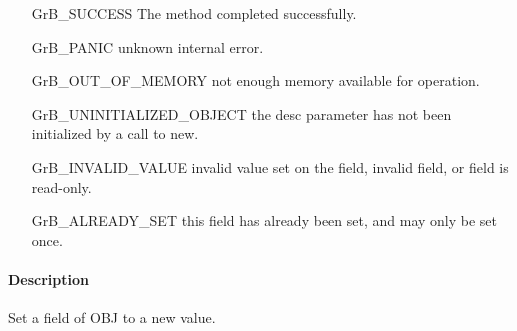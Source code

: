 \begin{itemize}[leftmargin=2.1in]
    \item[{\sf GrB\_SUCCESS}]  The method completed successfully.
    \item[{\sf GrB\_PANIC}]             unknown internal error.
    \item[{\sf GrB\_OUT\_OF\_MEMORY}]          not enough memory available for operation.
    \item[{\sf GrB\_UNINITIALIZED\_OBJECT}]          the {\sf desc} parameter has not been
                                        initialized by a call to {\sf new}.
    \item[{\sf GrB\_INVALID\_VALUE}]    invalid value set on the field, invalid field, or field is read-only.
    \item[{\sf GrB\_ALREADY\_SET}]  this field has already been set, and may only be set once. 
    \end{itemize}

\paragraph{Description}

Set a field of {\sf OBJ} to a new value. 